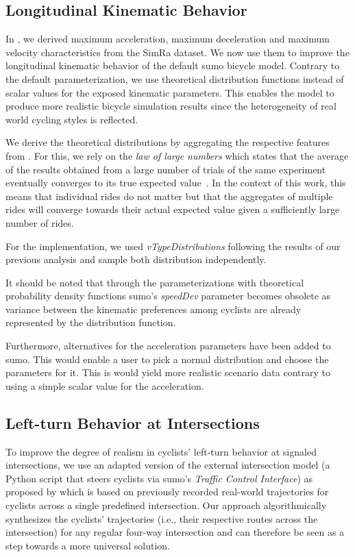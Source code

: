 \subsection{Longitudinal Kinematic Behavior}
\label{subsec:longitudinal_kinematic_behavior}
In , we derived maximum acceleration, maximum deceleration and maximum velocity characteristics from the SimRa dataset.
We now use them to improve the longitudinal kinematic behavior of the default \ac{sumo} bicycle model.
Contrary to the default parameterization, we use theoretical distribution functions instead of scalar values for the exposed kinematic parameters.
This enables the model to produce more realistic bicycle simulation results since the heterogeneity of real world cycling styles is reflected.

We derive the theoretical distributions by aggregating the respective features from .
For this, we rely on the \textit{law of large numbers} which states that the average of the results obtained from a large number of trials of the same experiment eventually converges to its true expected value~\cite{etemadi1981elementary}.
In the context of this work, this means that individual rides do not matter but that the aggregates of multiple rides will converge towards their actual expected value given a sufficiently large number of rides.

For the implementation, we used \textit{vTypeDistributions} following the results of our previous analysis and sample both distribution independently.

It should be noted that through the parameterizations with theoretical probability density functions \ac{sumo}'s \textit{speedDev} parameter becomes obsolete as variance between the kinematic preferences among cyclists are already represented by the distribution function.

Furthermore, alternatives for the acceleration parameters have been added to \ac{sumo}. This would enable a user to pick a normal distribution and choose the parameters for it.
This is would yield more realistic scenario data contrary to using a simple scalar value for the acceleration.

\subsection{Left-turn Behavior at Intersections}
\label{subsec:left-turn_behavior_at_intersections}
To improve the degree of realism in cyclists' left-turn behavior at signaled intersections, we use an adapted version of the external intersection model (a Python script that steers cyclists via \ac{sumo}'s \textit{Traffic Control Interface}) as proposed by \textcite{kaths2016integration} which is based on previously recorded real-world trajectories for cyclists across a single predefined intersection.
Our approach algorithmically synthesizes the cyclists' trajectories (i.e., their respective routes across the intersection) for any regular four-way intersection and can therefore be seen as a step towards a more universal solution.

